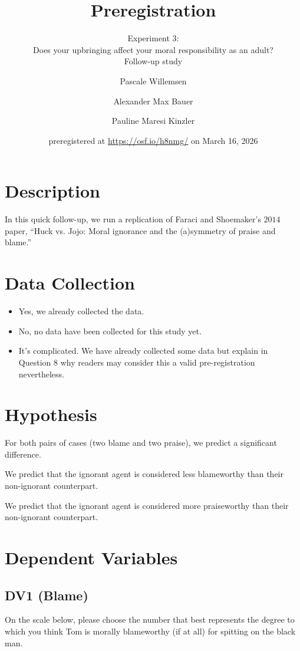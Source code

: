 \documentclass[scrarticle]{scrartcl}
\title{Preregistration}
\subtitle{Experiment 3:\\Does your upbringing affect your moral responsibility as an adult?\\Follow-up study}
\author[1]{Pascale Willemsen}
\author[2]{Alexander Max Bauer}
\author[1]{Pauline Maresi Kinzler }
\affil[1]{ University of Zurich}
\affil[2]{ Carl von Ossietzky University of Oldenburg}
\date{\small preregistered at \url{https://osf.io/h8nmg/} on March 16, 2026}
\begin{document}
\maketitle


\clearpage
\section{Description}
In this quick follow-up, we run a replication of Faraci and Shoemaker's $2014$ paper, \enquote{Huck vs. Jojo: Moral ignorance and the (a)symmetry of praise and blame.}


\section{Data Collection}
\begin{itemize}[label=\Square,noitemsep]
   \item Yes, we already collected the data.
   \item[\XBox] No, no data have been collected for this study yet.
   \item It's complicated. We have already collected some data but explain in Question $8$ why readers may consider this a valid pre-registration nevertheless.
\end{itemize}


\section{Hypothesis}
For both pairs of cases (two blame and two praise), we predict a significant difference.

We predict that the ignorant agent is considered less blameworthy than their non-ignorant counterpart.

We predict that the ignorant agent is considered more praiseworthy than their non-ignorant counterpart.


\section{Dependent Variables}


\subsection*{DV1 (Blame)}
On the scale below, please choose the number that best represents the degree to which you think Tom is morally blameworthy (if at all) for spitting on the black man.
\end{document}

